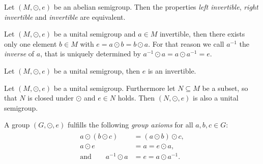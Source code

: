 \begin{remarks}
    \begin{remarkenumerate}
        \item Let $(M,\odot,e)$ be an abelian semigroup. Then the properties \emph{left invertible}, \emph{right invertible} and \emph{invertible} are equivalent.
        \item Let $(M,\odot,e)$ be a unital semigroup and $a\in M$ invertible, then there exists only one element $b\in M$ with $e=a\odot b=b\odot a$. For that reason we call $a^{-1}$ the \emph{inverse} of $a$, that is uniquely determined by $a^{-1}\odot a=a\odot a^{-1}=e$.
        \item Let $(M,\odot,e)$ be a unital semigroup, then $e$ is an invertible.
        \item\label{theorem:groups:unital_semigroup_subset} Let $(M,\odot,e)$ be a unital semigroup. Furthermore let $N\subseteq M$ be a subset, so that $N$ is closed under $\odot$ and $e\in N$ holds. Then $(N,\odot,e)$ is also a unital semigroup.
        \item A group $(G,\odot,e)$ fulfills the following \emph{group axioms} for all $a,b,c\in G$:
        \begin{align}\begin{split}
            a\odot (b\odot c)&=(a\odot b)\odot c,\\
            a\odot e&=a=e\odot a,\\
            \text{and}\qquad a^{-1}\odot a&=e=a\odot a^{-1}.
        \end{split}\end{align}
    \end{remarkenumerate}
\end{remarks}

\newcommand\symset{\rm{Sym}}
\newcommand\autrel[1]{\rm{Aut}(#1)}

